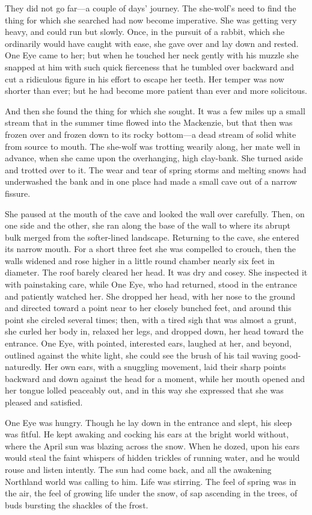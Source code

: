 \documentclass[10pt]{book}
\begin{document}
They did not go far—a couple of days’ journey. The she-wolf’s need to
find the thing for which she searched had now become imperative. She
was getting very heavy, and could run but slowly. Once, in the pursuit
of a rabbit, which she ordinarily would have caught with ease, she gave
over and lay down and rested. One Eye came to her; but when he touched
her neck gently with his muzzle she snapped at him with such quick
fierceness that he tumbled over backward and cut a ridiculous figure in
his effort to escape her teeth. Her temper was now shorter than ever;
but he had become more patient than ever and more solicitous.

And then she found the thing for which she sought. It was a few miles
up a small stream that in the summer time flowed into the Mackenzie,
but that then was frozen over and frozen down to its rocky bottom—a
dead stream of solid white from source to mouth. The she-wolf was
trotting wearily along, her mate well in advance, when she came upon
the overhanging, high clay-bank. She turned aside and trotted over to
it. The wear and tear of spring storms and melting snows had
underwashed the bank and in one place had made a small cave out of a
narrow fissure.

She paused at the mouth of the cave and looked the wall over carefully.
Then, on one side and the other, she ran along the base of the wall to
where its abrupt bulk merged from the softer-lined landscape. Returning
to the cave, she entered its narrow mouth. For a short three feet she
was compelled to crouch, then the walls widened and rose higher in a
little round chamber nearly six feet in diameter. The roof barely
cleared her head. It was dry and cosey. She inspected it with
painstaking care, while One Eye, who had returned, stood in the
entrance and patiently watched her. She dropped her head, with her nose
to the ground and directed toward a point near to her closely bunched
feet, and around this point she circled several times; then, with a
tired sigh that was almost a grunt, she curled her body in, relaxed her
legs, and dropped down, her head toward the entrance. One Eye, with
pointed, interested ears, laughed at her, and beyond, outlined against
the white light, she could see the brush of his tail waving
good-naturedly. Her own ears, with a snuggling movement, laid their
sharp points backward and down against the head for a moment, while her
mouth opened and her tongue lolled peaceably out, and in this way she
expressed that she was pleased and satisfied.

One Eye was hungry. Though he lay down in the entrance and slept, his
sleep was fitful. He kept awaking and cocking his ears at the bright
world without, where the April sun was blazing across the snow. When he
dozed, upon his ears would steal the faint whispers of hidden trickles
of running water, and he would rouse and listen intently. The sun had
come back, and all the awakening Northland world was calling to him.
Life was stirring. The feel of spring was in the air, the feel of
growing life under the snow, of sap ascending in the trees, of buds
bursting the shackles of the frost.
\end{document}
